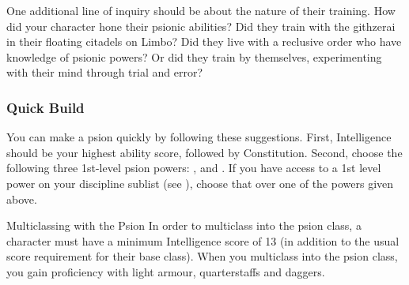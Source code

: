 One additional line of inquiry should be about the nature
of their training.
How did your character hone their psionic abilities?
Did they train with the githzerai in their floating citadels
on Limbo?
Did they live with a reclusive order who have knowledge
of psionic powers?
Or did they train by themselves,
experimenting with their mind through trial and error?

\subsubsection{Quick Build}
You can make a psion quickly by following these suggestions.
First, Intelligence should be your highest ability score,
followed by Constitution.
Second, choose the following three 1st-level psion powers:
,
and .
If you have access to a 1st level power on your discipline
sublist (see ),
choose that over one of the powers given above.

\begin{DndSidebar}[float=htbp]{Multiclassing with the Psion}
    In order to multiclass into the psion class,
    a character must have a minimum Intelligence score of 13
    (in addition to the usual score requirement for their base class).
    When you multiclass into the psion class,
    you gain proficiency with
    light armour, quarterstaffs and daggers.
\end{DndSidebar}

